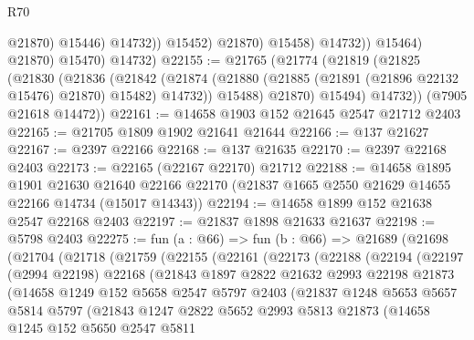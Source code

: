 \begin{lexlean}{R70}
\begin{coremodule}
                              @21870)
                            @15446)
                          @14732))
                      @15452)
                    @21870)
                  @15458)
                @14732))
            @15464)
          @21870)
        @15470)
      @14732)
@22155 := @21765
    (@21774
      (@21819
        (@21825
          (@21830
            (@21836
              (@21842
                (@21874 (@21880 (@21885 (@21891 (@21896 @22132 @15476) @21870) @15482) @14732))
                @15488)
              @21870)
            @15494)
          @14732))
      (@7905 @21618 @14472))
@22161 := @14658 @1903 @152 @21645 @2547 @21712 @2403
@22165 := @21705 @1809 @1902 @21641 @21644
@22166 := @137 @21627
@22167 := @2397 @22166
@22168 := @137 @21635
@22170 := @2397 @22168 @2403
@22173 := @22165 (@22167 @22170) @21712
@22188 := @14658
    @1895
    @1901
    @21630
    @21640
    @22166
    @22170
    (@21837 @1665 @2550 @21629 @14655 @22166 @14734 (@15017 @14343))
@22194 := @14658 @1899 @152 @21638 @2547 @22168 @2403
@22197 := @21837 @1898 @21633 @21637
@22198 := @5798 @2403
@22275 := fun (a : @66) =>
  fun (b : @66) =>
  @21689
    (@21698
      (@21704
        (@21718
          (@21759
            (@22155
              (@22161
                (@22173
                  (@22188
                    (@22194
                      (@22197
                        (@2994 @22198)
                        @22168
                        (@21843
                          @1897
                          @2822
                          @21632
                          @2993
                          @22198
                          @21873
                          (@14658
                            @1249
                            @152
                            @5658
                            @2547
                            @5797
                            @2403
                            (@21837
                              @1248
                              @5653
                              @5657
                              @5814
                              @5797
                              (@21843
                                @1247
                                @2822
                                @5652
                                @2993
                                @5813
                                @21873
                                (@14658
                                  @1245
                                  @152
                                  @5650
                                  @2547
                                  @5811

\end{coremodule}
\end{lexlean}
